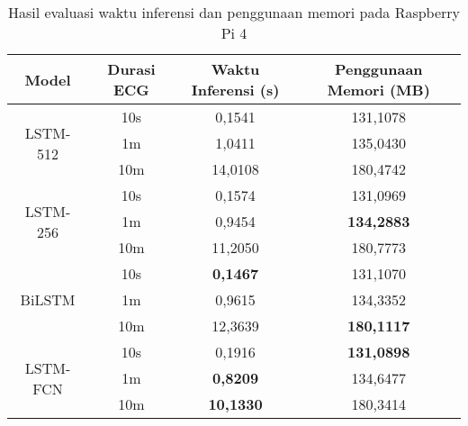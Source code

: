\begin{table}[H]
\centering
\caption{Hasil evaluasi waktu inferensi dan penggunaan memori pada Raspberry Pi 4}
\label{tab:raspi4}
\begin{tabular}{|c|c|c|c|}
\hline
\textbf{Model} & \textbf{Durasi ECG} & \textbf{Waktu Inferensi (s)} & \textbf{Penggunaan Memori (MB)} \\ \hline
\multirow{3}{*}{ LSTM-512 }       & 10s                 & 0,1541                      & 131,1078                   \\ 
              \cline{2-4}
               & 1m                  & 1,0411                      & 135,0430                   \\
              \cline{2-4}
               & 10m                 & 14,0108                     & 180,4742                   \\ \hline
\multirow{3}{*}{ LSTM-256 }       & 10s                 & 0,1574                      & 131,0969                   \\ 
              \cline{2-4}
               & 1m                  & 0,9454                      & \textbf{134,2883}                   \\ 
              \cline{2-4}
               & 10m                 & 11,2050                     & 180,7773                   \\ \hline
\multirow{3}{*}{ BiLSTM }         & 10s                 & \textbf{0,1467}                      & 131,1070                   \\ 
              \cline{2-4}
               & 1m                  & 0,9615                      & 134,3352                   \\ 
              \cline{2-4}
               & 10m                 & 12,3639                     & \textbf{180,1117}                   \\ \hline
\multirow{3}{*}{ LSTM-FCN }       & 10s                 & 0,1916                      & \textbf{131,0898}                   \\
              \cline{2-4}
               & 1m                  & \textbf{0,8209}                      & 134,6477                   \\ 
              \cline{2-4}
               & 10m                 & \textbf{10,1330}                     & 180,3414                   \\ \hline
\end{tabular}
\end{table}

